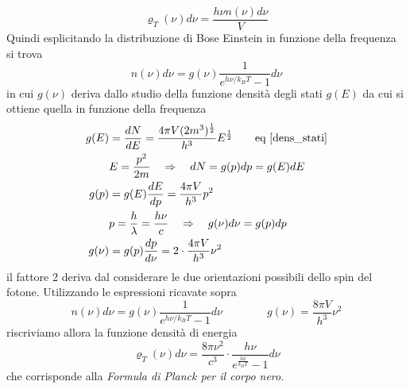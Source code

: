 \begin{equation}
\varrho_T(\nu) d\nu = \frac{h\nu n(\nu)d\nu}{V}
\label{dens_ener}
\end{equation}
Quindi esplicitando la distribuzione di Bose Einstein in funzione della frequenza si trova
\begin{equation}
n(\nu)d\nu = g(\nu) \frac{1}{e^{ h\nu / k_B T } - 1 } d\nu
\end{equation}
in cui $g(\nu)$ deriva dallo studio della funzione densità degli stati $g(E)$ da cui si ottiene quella in funzione della frequenza
\begin{equation}
\begin{split}
g(E) & = \frac{dN}{dE} = \frac{4 \pi V (2m^3)^{ \frac{1}{2} }}{h^3} E^{ \frac{1}{2} } \quad\quad \mbox{eq \ref{dens_stati}} \\
& E = \frac{p^2}{2m} \quad\Rightarrow\quad dN = g(p)dp = g(E)dE \\
g(p) & = g(E) \frac{dE}{dp} = \frac{4\pi V}{h^3} p^2 \\
& p = \frac{h}{\lambda} = \frac{h \nu}{c} \quad\Rightarrow\quad  g(\nu)d\nu  = g(p)dp \\
g(\nu) & = g(p) \frac{dp}{d\nu} = 2 \cdot \frac{4\pi V}{h^3} \nu^2
\end{split}
\end{equation}
il fattore 2 deriva dal considerare le due orientazioni possibili dello spin del fotone.
Utilizzando le espressioni ricavate sopra
\begin{equation}
n(\nu)d\nu = g(\nu) \frac{1}{e^{ h\nu / k_B T } - 1 } d\nu 
\quad\quad\quad\quad
g(\nu) = \frac{8\pi V}{h^3} \nu^2
\end{equation}
riscriviamo allora la funzione densità di energia
\begin{equation}
\varrho_T(\nu) d\nu = \frac{8 \pi \nu^2}{c^3} \cdot \frac{h\nu}{e^{\frac{h\nu}{k_B T}} - 1} d\nu
\end{equation}
che corrisponde alla \textit{Formula di Planck per il corpo nero}.


